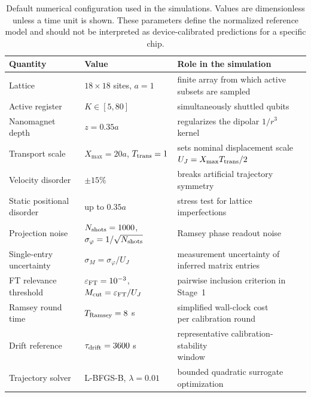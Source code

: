 \documentclass[a4paper,twocolumn,11pt]{quantumarticle}
\begin{document}
\begin{table}[t!]
\centering
\caption{Default numerical configuration used in the simulations. Values are dimensionless unless a time unit is shown. These parameters define the normalized reference model and should not be interpreted as device-calibrated predictions for a specific chip.}
\label{tab:simulation_parameters}
\renewcommand{\arraystretch}{1.2}
\begin{tabular}{lll}
\hline
Quantity & Value & Role in the simulation \\
\hline
Lattice & $18\times18$ sites, $a=1$ & \makecell[l]{finite array from which active \\ subsets are sampled} \\
Active register & $K\in[5,80]$ & simultaneously shuttled qubits \\
Nanomagnet depth & $z=0.35a$ & regularizes the dipolar $1/r^3$ kernel \\
Transport scale & \makecell[l]{$X_{\max}=20a$, \\ $T_{\rm trans}=1$} & \makecell[l]{sets nominal displacement scale \\ $U_J=X_{\max}T_{\rm trans}/2$} \\
Velocity disorder & $\pm15\%$ & breaks artificial trajectory symmetry \\
Static positional disorder & up to $0.35a$ & stress test for lattice imperfections \\
Projection noise & $N_{\rm shots}=1000$, $\sigma_\varphi=1/\sqrt{N_{\rm shots}}$ & Ramsey phase readout noise \\
Single-entry uncertainty & $\sigma_M=\sigma_\varphi/U_J$ & \makecell[l]{measurement uncertainty of \\ inferred matrix entries} \\
FT relevance threshold & $\varepsilon_{\rm FT}=10^{-3}$, $M_{\rm cut}=\varepsilon_{\rm FT}/U_J$ & pairwise inclusion criterion in Stage~1 \\
Ramsey round time & $T_{\rm Ramsey}=8$ s & \makecell[l]{simplified wall-clock cost \\ per calibration round} \\
Drift reference & $\tau_{\rm drift}=3600$ s & \makecell[l]{representative calibration-stability \\ window} \\
Trajectory solver & L-BFGS-B, $\lambda=0.01$ & \makecell[l]{bounded quadratic surrogate \\ optimization} \\
\hline
\end{tabular}
\end{table}
\end{document}

